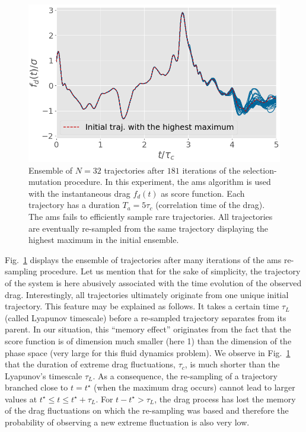 \documentclass{jfm}
\begin{document}
\begin{figure}
  \centering
  \includegraphics[width=.7\linewidth]{AMS_drag_trajectories/AMS_drag_trajectories.png}
  \caption{\label{fig:AMS_drag_trajectories} Ensemble of $N = 32$ trajectories after $181$ iterations of the selection-mutation procedure. In this experiment, the \ac{ams} algorithm is used with the instantaneous drag $f_d(t)$ as score function. Each trajectory has a duration $T_a = 5\tau_c$ (correlation time of the drag).
  The \ac{ams} fails to efficiently sample rare trajectories. All trajectories are eventually re-sampled from the same trajectory displaying the highest maximum in the initial ensemble.}
\end{figure}

%
Fig.~\ref{fig:AMS_drag_trajectories} displays the ensemble of trajectories after many iterations of the \ac{ams} re-sampling procedure. 
%
Let us mention that for the sake of simplicity, the trajectory of the system is here abusively associated with the time evolution of the observed drag.  
%
Interestingly, all trajectories ultimately originate from one unique initial trajectory. 
%
This feature may be explained as follows.
It takes a certain time $\tau_L$ (called Lyapunov timescale) before a re-sampled trajectory separates from its parent. In our situation, this ``memory effect'' originates from the fact that the score function is of dimension much smaller (here 1) than the dimension of the phase space (very large for this fluid dynamics problem). 
%
We observe in Fig.~\ref{fig:AMS_drag_trajectories} that the duration of extreme drag fluctuations, $\tau_c$, is much shorter than the Lyapunov's timescale $\tau_L$.
As a consequence, the re-sampling of a trajectory branched close to $t=t^{\star}$ (when the maximum drag occurs) cannot lead to larger values at $t^{\star} \leq t \leq t^{\star}+\tau_L$.
For $t - t^{\star} >\tau_L$, the drag process has lost the memory of the drag fluctuations on which the re-sampling was based and therefore the probability of observing a new extreme fluctuation is also very low.
%
\end{document}
